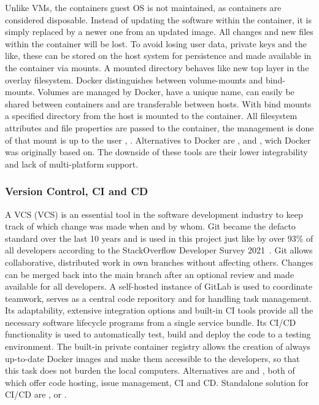 \documentclass[12pt, a4paper]{article}
\begin{document}
        Unlike \ac{VM}s, the containers guest \ac{OS} is not maintained, as containers are considered disposable. Instead of updating the software within the container, it is simply replaced by a newer one from an updated image. All changes and new files within the container will be lost. To avoid losing user data, private keys and the like, these can be stored on the host system for persistence and made available in the container via mounts. A mounted directory behaves like new top layer in the overlay filesystem. Docker distinguishes between volume-mounts and bind-mounts. Volumes are managed by Docker, have a unique name, can easily be shared between containers and are transferable between hosts. With bind mounts a specified directory from the host is mounted to the container. All filesystem attributes and file properties are passed to the container, the management is done of that mount is up to the user \cite{docker2020}, \cite{dockerdocs}.\newline
        Alternatives to Docker are ,  and , wich Docker was originally based on. The downside of these tools are their lower integrability and lack of multi-platform support.

        \subsubsection{Version Control, \acl{CI} and \acl{CD}}
        A \acl{VCS} (\ac{VCS}) is an essential tool in the software development industry to keep track of which change was made when and by whom. Git became the defacto standard over the last 10 years and is used in this project just like by over 93\% of all developers according to the StackOverflow Developer Survey 2021~\cite{stackoverflow2018}. Git allows collaborative, distributed work in own branches without affecting others. Changes can be merged back into the main branch after an optional review and made available for all developers. A self-hosted instance of GitLab is used to coordinate teamwork, serves as a central code repository and for handling task management. Its adaptability, extensive integration options and built-in \ac{CI} tools provide all the necessary software lifecycle programs from a single service bundle. Its \ac{CI}/\ac{CD} functionality is used to automatically test, build and deploy the code to a testing environment. The built-in private container registry allows the creation of always up-to-date Docker images and make them accessible to the developers, so that this task does not burden the local computers. Alternatives are  and , both of which offer code hosting, issue management, \ac{CI} and \ac{CD}. Standalone solution for \ac{CI}/\ac{CD} are ,  or .
\end{document}

